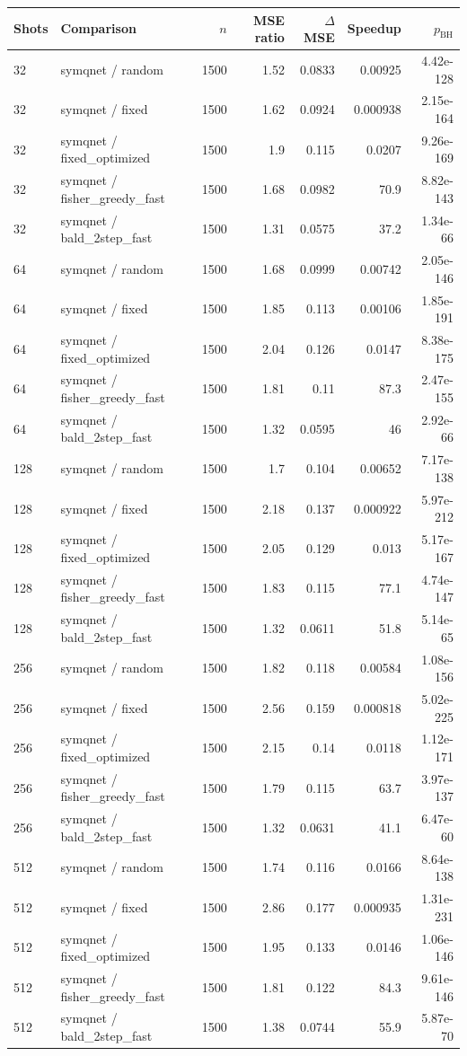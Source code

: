 \begin{tabular}{llrrrrr}
\toprule
Shots & Comparison & $n$ & MSE ratio & $\Delta$MSE & Speedup & $p_{\mathrm{BH}}$ \\
\midrule
32 & symqnet / random & 1500 & 1.52 & 0.0833 & 0.00925 & 4.42e-128 \\
32 & symqnet / fixed & 1500 & 1.62 & 0.0924 & 0.000938 & 2.15e-164 \\
32 & symqnet / fixed\_optimized & 1500 & 1.9 & 0.115 & 0.0207 & 9.26e-169 \\
32 & symqnet / fisher\_greedy\_fast & 1500 & 1.68 & 0.0982 & 70.9 & 8.82e-143 \\
32 & symqnet / bald\_2step\_fast & 1500 & 1.31 & 0.0575 & 37.2 & 1.34e-66 \\
64 & symqnet / random & 1500 & 1.68 & 0.0999 & 0.00742 & 2.05e-146 \\
64 & symqnet / fixed & 1500 & 1.85 & 0.113 & 0.00106 & 1.85e-191 \\
64 & symqnet / fixed\_optimized & 1500 & 2.04 & 0.126 & 0.0147 & 8.38e-175 \\
64 & symqnet / fisher\_greedy\_fast & 1500 & 1.81 & 0.11 & 87.3 & 2.47e-155 \\
64 & symqnet / bald\_2step\_fast & 1500 & 1.32 & 0.0595 & 46 & 2.92e-66 \\
128 & symqnet / random & 1500 & 1.7 & 0.104 & 0.00652 & 7.17e-138 \\
128 & symqnet / fixed & 1500 & 2.18 & 0.137 & 0.000922 & 5.97e-212 \\
128 & symqnet / fixed\_optimized & 1500 & 2.05 & 0.129 & 0.013 & 5.17e-167 \\
128 & symqnet / fisher\_greedy\_fast & 1500 & 1.83 & 0.115 & 77.1 & 4.74e-147 \\
128 & symqnet / bald\_2step\_fast & 1500 & 1.32 & 0.0611 & 51.8 & 5.14e-65 \\
256 & symqnet / random & 1500 & 1.82 & 0.118 & 0.00584 & 1.08e-156 \\
256 & symqnet / fixed & 1500 & 2.56 & 0.159 & 0.000818 & 5.02e-225 \\
256 & symqnet / fixed\_optimized & 1500 & 2.15 & 0.14 & 0.0118 & 1.12e-171 \\
256 & symqnet / fisher\_greedy\_fast & 1500 & 1.79 & 0.115 & 63.7 & 3.97e-137 \\
256 & symqnet / bald\_2step\_fast & 1500 & 1.32 & 0.0631 & 41.1 & 6.47e-60 \\
512 & symqnet / random & 1500 & 1.74 & 0.116 & 0.0166 & 8.64e-138 \\
512 & symqnet / fixed & 1500 & 2.86 & 0.177 & 0.000935 & 1.31e-231 \\
512 & symqnet / fixed\_optimized & 1500 & 1.95 & 0.133 & 0.0146 & 1.06e-146 \\
512 & symqnet / fisher\_greedy\_fast & 1500 & 1.81 & 0.122 & 84.3 & 9.61e-146 \\
512 & symqnet / bald\_2step\_fast & 1500 & 1.38 & 0.0744 & 55.9 & 5.87e-70 \\
\bottomrule
\end{tabular}
